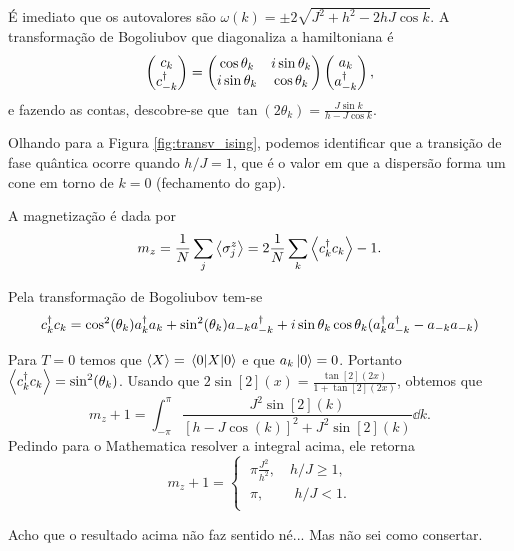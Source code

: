 \documentclass[a4paper,10pt]{article}
\begin{document}
É imediato que os autovalores são $\omega(k) = \pm 2\sqrt{J^2 + h^2 - 2hJ \cos k}$. A transformação de Bogoliubov que diagonaliza a hamiltoniana é
$$
\begin{pmatrix}
c_k \\ c_{-k}^\dagger
\end{pmatrix}
=
\begin{pmatrix}
 \cos \theta_k & i\sin \theta_k  \\
i\sin \theta_k &  \cos \theta_k
\end{pmatrix}
\begin{pmatrix}
a_k \\ a_{-k}^\dagger
\end{pmatrix},
$$
e fazendo as contas, descobre-se que $\tan(2\theta_k) = \frac{J \sin k}{h - J \cos k}$.


Olhando para a Figura \ref{fig:transv_ising}, podemos identificar que a transição de fase quântica ocorre quando $h/J = 1$, que é o valor em que a dispersão forma um cone em torno de $k = 0$ (fechamento do gap).

\n

A magnetização é dada por
$$
m_z = \frac{1}{N} \sum_{j} \ev{\s_j^z} = 2 \frac{1}{N}\sum_{k} \ev{c_k^\d c_k} - 1.
$$

Pela transformação de Bogoliubov tem-se
$$
c_k^\dagger c_k = \cos[2](\theta_k) a_k^\dagger a_k + \sin[2](\theta_k) a_{-k}a_{-k}^\dagger
+ i \sin\theta_k \cos\theta_k (a_{k}^\dagger a_{-k}^\dagger - a_{-k} a_{-k})
$$

Para $T = 0$ temos que $\ev{X} = \ev{X}{0}$ e que $a_k \ket{0} = 0$. Portanto $\ev{c_k^\d c_k} = \sin[2](\theta_k)$. Usando que $2 \sin[2](x) = \frac{\tan[2](2x)}{1 + \tan[2](2x)}$, obtemos que
$$
m_z + 1 = \int_{-\pi}^{\pi} \frac{J^2 \sin[2](k)}{[h-J\cos(k)]^2 + J^2\sin[2](k)} \dd{k}.
$$
Pedindo para o Mathematica resolver a integral acima, ele retorna
$$
m_z + 1 =
\begin{cases}
\; \pi \frac{J^2}{h^2} , \quad h/J \geq 1, \\
\; \pi , \quad \quad \, h/J < 1. \\
\end{cases}
$$

Acho que o resultado acima não faz sentido né... Mas não sei como consertar.
\end{document}
